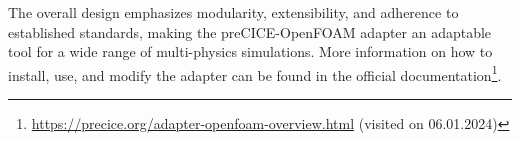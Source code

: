 The overall design emphasizes modularity, extensibility, and adherence to established standards, making the preCICE-OpenFOAM adapter an adaptable tool for a wide range of multi-physics simulations. More information on how to install, use, and modify the adapter can be found in the official documentation\footnote{\url{https://precice.org/adapter-openfoam-overview.html} (visited on 06.01.2024)}.

